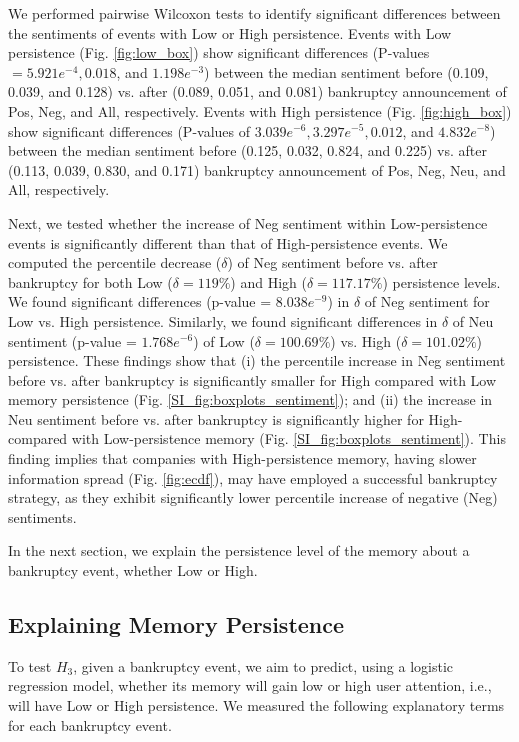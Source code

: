 \documentclass[9pt,twocolumn,twoside,lineno]{pnas-new}
\begin{document}
We performed pairwise Wilcoxon tests to identify significant differences between the sentiments of events with Low or High persistence. 
Events with Low persistence (Fig. \ref{fig:low_box}) show significant differences (P-values $= 5.921e^{-4}, 0.018$, and $1.198e^{-3}$) between the median sentiment before (0.109, 0.039, and 0.128) vs. after (0.089, 0.051, and 0.081) bankruptcy announcement of Pos, Neg, and All, respectively.
Events with High persistence (Fig. \ref{fig:high_box}) show significant differences (P-values of $3.039e^{-6}, 3.297e^{-5}, 0.012$, and $ 4.832e^{-8}$) between the median sentiment before (0.125, 0.032, 0.824, and 0.225) vs. after (0.113, 0.039, 0.830, and 0.171) bankruptcy announcement of Pos, Neg, Neu, and All, respectively.

Next, we tested whether the increase of Neg sentiment within Low-persistence events is significantly different than that of High-persistence events.
We computed the percentile decrease ($\delta$) of Neg sentiment before vs. after  bankruptcy for both Low ($\delta= 119\%$) and High ($\delta=117.17\%$) persistence levels.
We found significant differences (p-value = $8.038e^{-9}$) in $\delta$ of Neg sentiment for Low vs. High persistence.
Similarly, we found significant differences in $\delta$ of Neu sentiment (p-value = $1.768e^{-6}$) of Low ($\delta=100.69\%$) vs. High ($\delta=101.02\%$) persistence.
These findings show that 
(i) the percentile increase in Neg sentiment before vs. after bankruptcy is significantly smaller for High compared with Low memory persistence (Fig. \ref{SI_fig:boxplots_sentiment}); and
(ii) the increase in Neu sentiment before vs. after bankruptcy  is significantly higher for High- compared with Low-persistence memory (Fig. \ref{SI_fig:boxplots_sentiment}). 
This finding implies that companies with High-persistence memory, having slower information spread (Fig. \ref{fig:ecdf}), may have employed a successful bankruptcy strategy, as they exhibit significantly lower percentile increase of negative (Neg) sentiments. 

In the next section, we explain the persistence level of the memory about a bankruptcy event, whether Low or High.

\subsection*{Explaining Memory Persistence}
To test $H_3$, given a bankruptcy event, we aim to predict, using a logistic regression model, whether its memory will gain low or high user attention, i.e., will have Low or High persistence.
We measured the following explanatory terms for each bankruptcy event.
\end{document}
